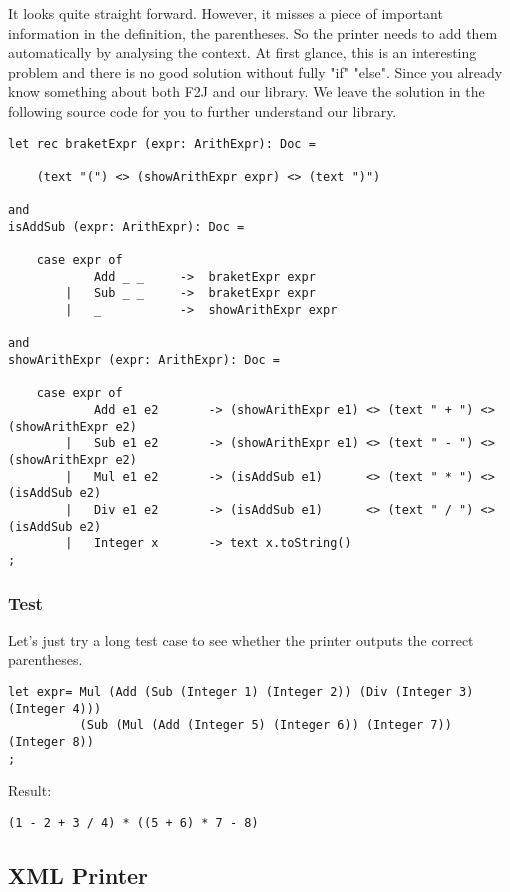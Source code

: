 It looks quite straight forward. However, it misses a piece of important information in the definition, the parentheses. So the printer needs to add them automatically by analysing the context. At first glance, this is an interesting problem and there is no good solution without fully "if" "else". Since you already know something about both F2J and our library. We leave the solution in the following source code for you to further understand our library.
\begin{lstlisting}
let rec braketExpr (expr: ArithExpr): Doc =

    (text "(") <> (showArithExpr expr) <> (text ")")

and
isAddSub (expr: ArithExpr): Doc =

    case expr of
            Add _ _     ->  braketExpr expr
        |   Sub _ _     ->  braketExpr expr
        |   _           ->  showArithExpr expr

and
showArithExpr (expr: ArithExpr): Doc =

    case expr of
            Add e1 e2       -> (showArithExpr e1) <> (text " + ") <> (showArithExpr e2)
        |   Sub e1 e2       -> (showArithExpr e1) <> (text " - ") <> (showArithExpr e2)
        |   Mul e1 e2       -> (isAddSub e1)      <> (text " * ") <> (isAddSub e2)
        |   Div e1 e2       -> (isAddSub e1)      <> (text " / ") <> (isAddSub e2)
        |   Integer x       -> text x.toString()
;
\end{lstlisting}

\subsubsection{Test}
Let's just try a long test case to see whether the printer outputs the correct parentheses.
\begin{lstlisting}
let expr= Mul (Add (Sub (Integer 1) (Integer 2)) (Div (Integer 3) (Integer 4)))
          (Sub (Mul (Add (Integer 5) (Integer 6)) (Integer 7)) (Integer 8))
;
\end{lstlisting}

Result:
\begin{lstlisting}
(1 - 2 + 3 / 4) * ((5 + 6) * 7 - 8)
\end{lstlisting}

\subsection{XML Printer}

